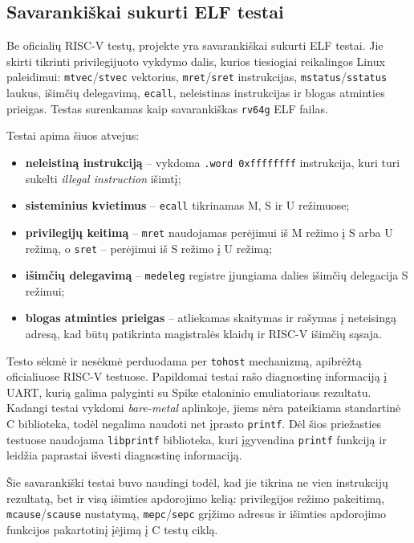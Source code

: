 \subsection{Savarankiškai sukurti ELF testai}
\label{sec:savarankiski-elf-testai}

Be oficialių RISC-V testų, projekte yra savarankiškai sukurti ELF testai. Jie skirti tikrinti privilegijuoto vykdymo dalis, kurios tiesiogiai reikalingos Linux paleidimui: \texttt{mtvec}/\texttt{stvec} vektorius, \texttt{mret}/\texttt{sret} instrukcijas, \texttt{mstatus}/\texttt{sstatus} laukus, išimčių delegavimą, \texttt{ecall}, neleistinas instrukcijas ir blogas atminties prieigas. Testas surenkamas kaip savarankiškas \texttt{rv64g} ELF failas.

Testai apima šiuos atvejus:

\begin{itemize}
    \item \textbf{neleistiną instrukciją} -- vykdoma \texttt{.word 0xffffffff} instrukcija, kuri turi sukelti \textit{illegal instruction} išimtį;
    \item \textbf{sisteminius kvietimus} -- \texttt{ecall} tikrinamas M, S ir U režimuose;
    \item \textbf{privilegijų keitimą} -- \texttt{mret} naudojamas perėjimui iš M režimo į S arba U režimą, o \texttt{sret} -- perėjimui iš S režimo į U režimą;
    \item \textbf{išimčių delegavimą} -- \texttt{medeleg} registre įjungiama dalies išimčių delegacija S režimui;
    \item \textbf{blogas atminties prieigas} -- atliekamas skaitymas ir rašymas į neteisingą adresą, kad būtų patikrinta magistralės klaidų ir RISC-V išimčių sąsaja.
\end{itemize}

Testo sėkmė ir nesėkmė perduodama per \texttt{tohost} mechanizmą, apibrėžtą oficialiuose RISC-V testuose. Papildomai testai rašo diagnostinę informaciją į UART, kurią galima palyginti su Spike etaloninio emuliatoriaus rezultatu. Kadangi testai vykdomi \textit{bare-metal} aplinkoje, jiems nėra pateikiama standartinė C biblioteka, todėl negalima naudoti net įprasto \texttt{printf}. Dėl šios priežasties testuose naudojama \texttt{libprintf} biblioteka, kuri įgyvendina \texttt{printf} funkciją ir leidžia paprastai išvesti diagnostinę informaciją.

Šie savarankiški testai buvo naudingi todėl, kad jie tikrina ne vien instrukcijų rezultatą, bet ir visą išimties apdorojimo kelią: privilegijos režimo pakeitimą, \texttt{mcause}/\texttt{scause} nustatymą, \texttt{mepc}/\texttt{sepc} grįžimo adresus ir išimties apdorojimo funkcijos pakartotinį įėjimą į C testų ciklą.

